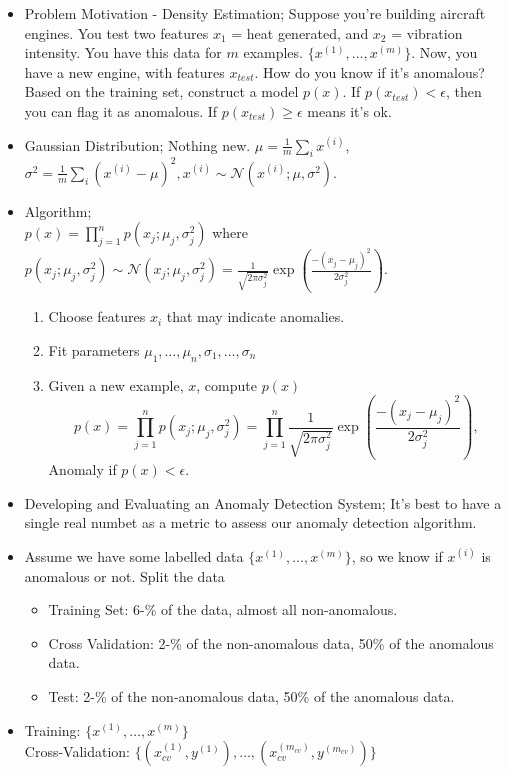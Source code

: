 \documentclass[10pt]{article}
\begin{document}
\begin{itemize}
  \item Problem Motivation - Density Estimation; Suppose you're
    building aircraft engines. You test two features $x_1$ = heat
    generated, and $x_2$ = vibration intensity. You have this data for
    $m$ examples. $\{ x^{(1)}, \dots, x^{(m)}\}$. Now, you have a new
    engine, with features $x_{test}$. How do you know if it's
    anomalous? Based on the training set, construct a model $p(x)$. If
    $p(x_{test})<\epsilon$, then you can flag it as anomalous. If
    $p(x_{test}) \geq \epsilon$ means it's ok.
  \item Gaussian Distribution; Nothing new. $\mu = \frac{1}{m}\sum_ix^{(i)}$, $\sigma^2 = \frac{1}{m} \sum_i ( x^{(i)} - \mu)^2, x^{(i)} \sim \mathcal{N}(x^{(i)}; \mu, \sigma^2)$.
  \item Algorithm; \\ $p(x) = \prod_{j=1}^n p(x_j; \mu_j, \sigma_j^2)$ where $p(x_j; \mu_j, \sigma_j^2) \sim \mathcal{N}(x_j; \mu_j, \sigma_j^2) = \frac{1}{\sqrt{2 \pi \sigma_j^2}} \exp \left( \frac{-(x_j - \mu_j)^2}{2 \sigma_j^2}\right)$.
    \begin{enumerate}
      \item Choose features $x_i$ that may indicate anomalies.
      \item Fit parameters $\mu_1, \dots, \mu_n, \sigma_1, \dots, \sigma_n$
      \item Given a new example, $x$, compute $p(x)$
        \begin{equation*}
          p(x) = \prod_{j=1}^n p(x_j; \mu_j, \sigma_j^2) = \prod_{j=1}^n \frac{1}{\sqrt{2 \pi \sigma_j^2}} \exp \left( \frac{-(x_j - \mu_j)^2}{2 \sigma_j^2}\right),
        \end{equation*}
        Anomaly if $p(x) < \epsilon$.
    \end{enumerate}
  \item Developing and Evaluating an Anomaly Detection System; It's best to have a single real numbet as a metric to assess our anomaly detection algorithm.
  \item Assume we have some labelled data $\{ x^{(1)}, \dots, x^{(m)} \}$, so we know if $x^{(i)}$ is anomalous or not. Split the data
    \begin{itemize}
      \item Training Set: 6-\% of the data, almost all non-anomalous.
      \item Cross Validation: 2-\% of the non-anomalous data, 50\% of the anomalous data.
      \item Test: 2-\% of the non-anomalous data, 50\% of the anomalous data.
    \end{itemize}
  \item Training: $\{ x^{(1)}, \dots, x^{(m)}\}$ \\
    Cross-Validation: $\{ (x_{cv}^{(1)}, y^{(1)}), \dots, (x_{cv}^{(m_{cv})}, y^{(m_{cv})}) \}$
\end{itemize}
\end{document}

